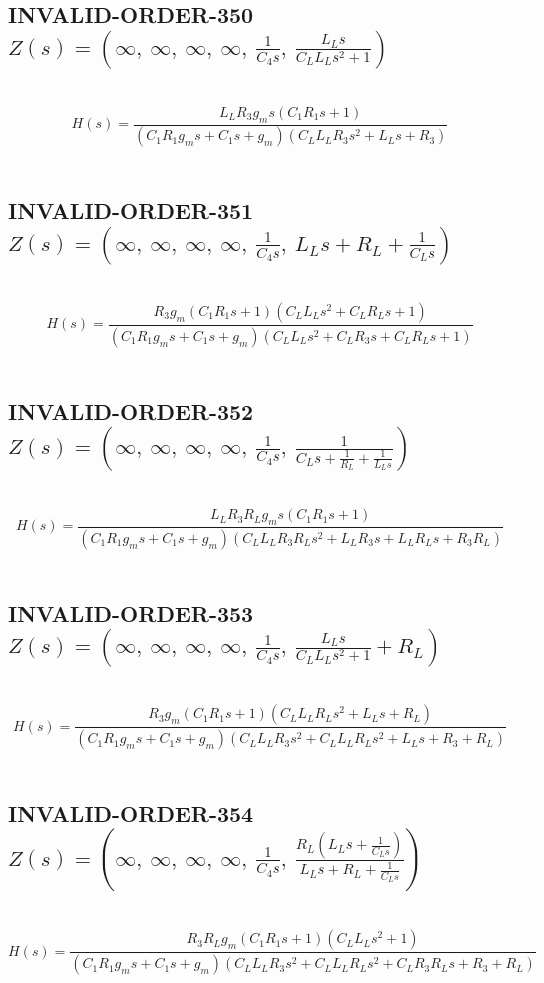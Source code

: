 \documentclass{article}
\begin{document}
\subsection{INVALID-ORDER-350 $Z(s) = \left( \infty, \  \infty, \  \infty, \  \infty, \  \frac{1}{C_{4} s}, \  \frac{L_{L} s}{C_{L} L_{L} s^{2} + 1}\right)$ } \ 
\textbf{\[H(s) = \frac{L_{L} R_{3} g_{m} s \left(C_{1} R_{1} s + 1\right)}{\left(C_{1} R_{1} g_{m} s + C_{1} s + g_{m}\right) \left(C_{L} L_{L} R_{3} s^{2} + L_{L} s + R_{3}\right)}\] } \ 
\subsection{INVALID-ORDER-351 $Z(s) = \left( \infty, \  \infty, \  \infty, \  \infty, \  \frac{1}{C_{4} s}, \  L_{L} s + R_{L} + \frac{1}{C_{L} s}\right)$ } \ 
\textbf{\[H(s) = \frac{R_{3} g_{m} \left(C_{1} R_{1} s + 1\right) \left(C_{L} L_{L} s^{2} + C_{L} R_{L} s + 1\right)}{\left(C_{1} R_{1} g_{m} s + C_{1} s + g_{m}\right) \left(C_{L} L_{L} s^{2} + C_{L} R_{3} s + C_{L} R_{L} s + 1\right)}\] } \ 
\subsection{INVALID-ORDER-352 $Z(s) = \left( \infty, \  \infty, \  \infty, \  \infty, \  \frac{1}{C_{4} s}, \  \frac{1}{C_{L} s + \frac{1}{R_{L}} + \frac{1}{L_{L} s}}\right)$ } \ 
\textbf{\[H(s) = \frac{L_{L} R_{3} R_{L} g_{m} s \left(C_{1} R_{1} s + 1\right)}{\left(C_{1} R_{1} g_{m} s + C_{1} s + g_{m}\right) \left(C_{L} L_{L} R_{3} R_{L} s^{2} + L_{L} R_{3} s + L_{L} R_{L} s + R_{3} R_{L}\right)}\] } \ 
\subsection{INVALID-ORDER-353 $Z(s) = \left( \infty, \  \infty, \  \infty, \  \infty, \  \frac{1}{C_{4} s}, \  \frac{L_{L} s}{C_{L} L_{L} s^{2} + 1} + R_{L}\right)$ } \ 
\textbf{\[H(s) = \frac{R_{3} g_{m} \left(C_{1} R_{1} s + 1\right) \left(C_{L} L_{L} R_{L} s^{2} + L_{L} s + R_{L}\right)}{\left(C_{1} R_{1} g_{m} s + C_{1} s + g_{m}\right) \left(C_{L} L_{L} R_{3} s^{2} + C_{L} L_{L} R_{L} s^{2} + L_{L} s + R_{3} + R_{L}\right)}\] } \ 
\subsection{INVALID-ORDER-354 $Z(s) = \left( \infty, \  \infty, \  \infty, \  \infty, \  \frac{1}{C_{4} s}, \  \frac{R_{L} \left(L_{L} s + \frac{1}{C_{L} s}\right)}{L_{L} s + R_{L} + \frac{1}{C_{L} s}}\right)$ } \ 
\textbf{\[H(s) = \frac{R_{3} R_{L} g_{m} \left(C_{1} R_{1} s + 1\right) \left(C_{L} L_{L} s^{2} + 1\right)}{\left(C_{1} R_{1} g_{m} s + C_{1} s + g_{m}\right) \left(C_{L} L_{L} R_{3} s^{2} + C_{L} L_{L} R_{L} s^{2} + C_{L} R_{3} R_{L} s + R_{3} + R_{L}\right)}\] } \ 
\end{document}
